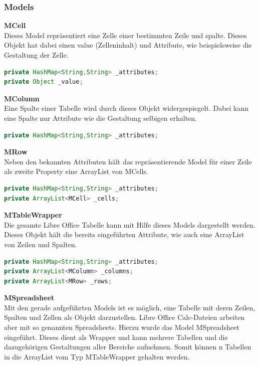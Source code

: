 \subsubsection{Models}
\label{loModels}

\textbf{MCell}\\
Dieses Model repräsentiert eine Zelle einer bestimmten Zeile und spalte. Dieses Objekt hat dabei einen {\frqq}value{\flqq} (Zelleninhalt) und Attribute, wie beispielsweise die Gestaltung der Zelle.

\begin{lstlisting}[caption=Repräsentation einer Zelle einer Libre Office Calc Datei, language=Java]
private HashMap<String,String> _attributes;
private Object _value;
\end{lstlisting}
\textbf{MColumn}\\
Eine Spalte einer Tabelle wird durch dieses Objekt widergespiegelt. Dabei kann eine Spalte nur Attribute wie die Gestaltung selbigen erhalten.
\begin{lstlisting}[caption=Repräsentation einer Spalte einer Libre Office Calc Datei, language=Java]
private HashMap<String,String> _attributes;
\end{lstlisting}
\textbf{MRow}\\
Neben den bekannten Attributen hält das repräsentierende Model für einer Zeile als zweite Property eine ArrayList von MCells.
\begin{lstlisting}[caption=Repräsentation einer Zeile einer Libre Office Calc Datei, language=Java]
private HashMap<String,String> _attributes;
private ArrayList<MCell> _cells;
\end{lstlisting}
\textbf{MTableWrapper}\\
Die gesamte Libre Office Tabelle kann mit Hilfe dieses Models dargestellt werden. Dieses Objekt hält die bereits eingeführten Attribute, wie auch eine ArrayList von Zeilen und Spalten.
\begin{lstlisting}[caption=Repräsentation einer Tabelle einer Libre Office Calc Datei inkl. aller Zeilen und Spalten, language=Java]
private HashMap<String,String> _attributes;
private ArrayList<MColumn> _columns;
private ArrayList<MRow> _rows;
\end{lstlisting}
\textbf{MSpreadsheet}\\
Mit den gerade aufgeführten Models ist es möglich, eine Tabelle mit deren Zeilen, Spalten und Zellen als Objekt darzustellen. Libre Office Calc-Dateien arbeiten aber mit so genannten Spreadsheets. Hierzu wurde das Model MSpreadsheet eingeführt. Dieses dient als Wrapper und kann mehrere Tabellen und die dazugehörigen Gestaltungen aller Bereiche aufnehmen. Somit können n Tabellen in die ArrayList vom Typ MTableWrapper gehalten werden.

